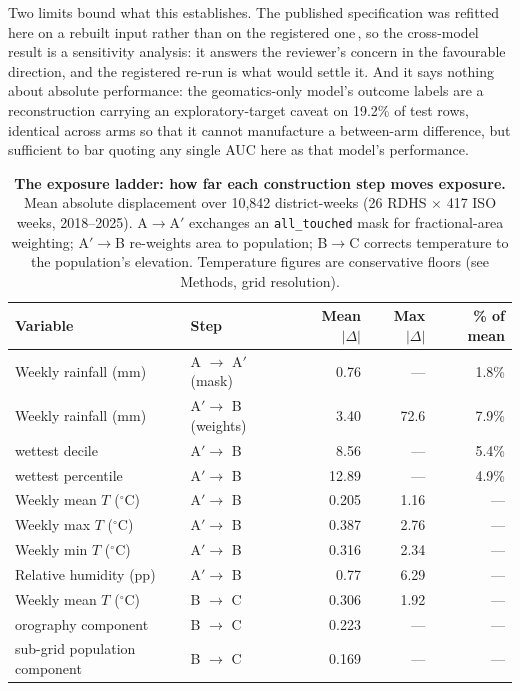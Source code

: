 Two limits bound what this establishes. The published specification was refitted here on a rebuilt input rather than on the registered one\,\REBUILD, so the cross-model result is a sensitivity analysis: it answers the reviewer's concern in the favourable direction, and the registered re-run is what would settle it. And it says nothing about absolute performance: the geomatics-only model's outcome labels are a reconstruction carrying an exploratory-target caveat on 19.2\% of test rows, identical across arms so that it cannot manufacture a between-arm difference, but sufficient to bar quoting any single AUC here as that model's performance.


\begin{table}[htbp]
\centering
\caption{\textbf{The exposure ladder: how far each construction step moves exposure.} Mean absolute displacement over 10{,}842 district-weeks (26 RDHS $\times$ 417 ISO weeks, 2018--2025). A$\to$A$'$ exchanges an \texttt{all\_touched} mask for fractional-area weighting; A$'\to$B re-weights area to population; B$\to$C corrects temperature to the population's elevation. Temperature figures are conservative floors (see Methods, grid resolution).}
\label{tab:wp5-ladder}
\begin{tabular}{llrrr}
\toprule
Variable & Step & Mean $|\Delta|$ & Max $|\Delta|$ & \% of mean \\
\midrule
Weekly rainfall (mm)      & A $\to$ A$'$ (mask)   & 0.76  & ---   & 1.8\% \\
Weekly rainfall (mm)      & A$'\to$ B (weights)   & 3.40  & 72.6  & 7.9\% \\
\quad wettest decile      & A$'\to$ B             & 8.56  & ---   & 5.4\% \\
\quad wettest percentile  & A$'\to$ B             & 12.89 & ---   & 4.9\% \\
Weekly mean $T$ ($^{\circ}$C)    & A$'\to$ B      & 0.205 & 1.16  & --- \\
Weekly max $T$ ($^{\circ}$C)     & A$'\to$ B      & 0.387 & 2.76  & --- \\
Weekly min $T$ ($^{\circ}$C)     & A$'\to$ B      & 0.316 & 2.34  & --- \\
Relative humidity (pp)           & A$'\to$ B      & 0.77  & 6.29  & --- \\
Weekly mean $T$ ($^{\circ}$C)    & B $\to$ C      & 0.306 & 1.92  & --- \\
\quad orography component        & B $\to$ C      & 0.223 & ---   & --- \\
\quad sub-grid population component & B $\to$ C   & 0.169 & ---   & --- \\
\bottomrule
\end{tabular}
\end{table}

